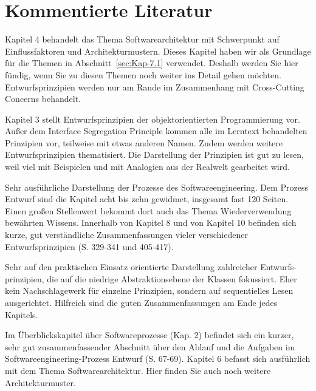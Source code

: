 \section{Kommentierte Literatur}
\label{sec:Kap-7.3}


{Kapitel 4 behandelt das Thema Softwarearchitektur mit Schwerpunkt auf Einflussfaktoren und Architekturmustern. Dieses Kapitel haben wir als Grundlage für die Themen in Abschnitt~\ref{sec:Kap-7.1} verwendet. Deshalb werden Sie hier fündig, wenn Sie zu diesen Themen noch weiter ins Detail gehen möchten. Entwurfsprinzipien werden nur am Rande im Zusammenhang mit Cross-Cutting Concerns behandelt.}

{Kapitel 3 stellt Entwurfsprinzipien der objektorientierten Programmierung vor. 
\linebreak %
Außer dem Interface Segregation Principle kommen alle im Lerntext behandelten Prinzipien vor, teilweise mit etwas anderen Namen. Zudem werden weitere Entwurfs\-prinzipien thematisiert. Die Darstellung der Prinzipien ist gut zu lesen, weil viel mit Beispielen und mit Analogien aus der Realwelt gearbeitet wird.}

{Sehr ausführliche Darstellung der Prozesse des Softwareengineering. Dem Prozess Entwurf sind die Kapitel acht bis zehn gewidmet, insgesamt fast 120 Seiten. Einen großen Stellenwert bekommt dort auch das Thema Wiederverwendung bewährten Wissens. Innerhalb von Kapitel 8 und von Kapitel 10 befinden sich kurze, gut verständliche Zusammenfassungen vieler verschiedener Entwurfsprinzipien (S. 329-341 und 405-417).}

{Sehr auf den praktischen Einsatz orientierte Darstellung zahlreicher Entwurfs-
\linebreak %
prinzipien, die auf die niedrige Abstraktionsebene der Klassen fokussiert. Eher kein Nachschlagewerk für einzelne Prinzipien, sondern auf sequentielles Lesen ausgerichtet. Hilfreich sind die guten Zusammenfassungen am Ende jedes Kapitels.}

{Im Überblickskapitel über Softwareprozesse (Kap. 2) befindet sich ein kurzer, sehr gut zusammenfassender Abschnitt über den Ablauf und die Aufgaben im Software\-engineering-Prozess Entwurf (S. 67-69). Kapitel 6 befasst sich ausführlich mit dem Thema Softwarearchitektur. Hier finden Sie auch noch weitere Architekturmuster.}

